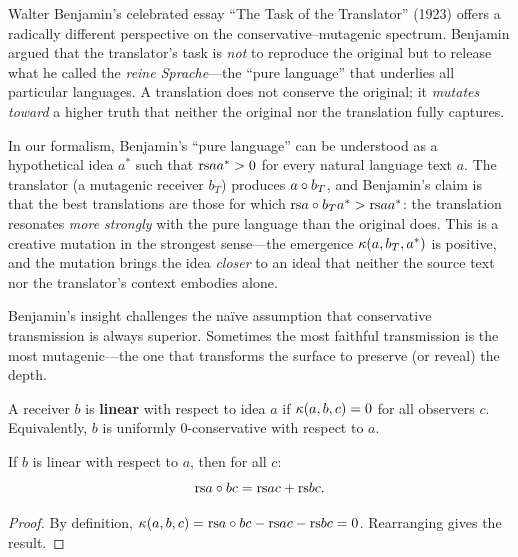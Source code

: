 \begin{interpretation}
\label{interp:ch9:benjamin_translator}
Walter Benjamin's celebrated essay ``The Task of the Translator'' (1923)
offers a radically different perspective on the conservative--mutagenic
spectrum.  Benjamin argued that the translator's task is \emph{not} to
reproduce the original but to release what he called the \emph{reine
Sprache}---the ``pure language'' that underlies all particular languages.  A
translation does not conserve the original; it \emph{mutates toward} a higher
truth that neither the original nor the translation fully captures.

In our formalism, Benjamin's ``pure language'' can be understood as a
hypothetical idea $a^*$ such that $\mathrm{rs}{a}{a^*} > 0$ for every natural
language text $a$.  The translator (a mutagenic receiver $b_T$) produces
$a \circ b_T$, and Benjamin's claim is that the best translations are
those for which $\mathrm{rs}{a \circ b_T}{a^*} > \mathrm{rs}{a}{a^*}$: the translation
resonates \emph{more strongly} with the pure language than the original does.
This is a creative mutation in the strongest sense---the emergence
$\kappa(a, b_T, a^*)$ is positive, and the mutation brings the idea
\emph{closer} to an ideal that neither the source text nor the translator's
context embodies alone.

Benjamin's insight challenges the na\"{i}ve assumption that conservative
transmission is always superior.  Sometimes the most faithful transmission
is the most mutagenic---the one that transforms the surface to preserve (or
reveal) the depth.
\end{interpretation}



\begin{definition}
\label{def:linear}
A receiver $b$ is \textbf{linear} with respect to idea $a$ if
$\kappa(a, b, c) = 0$ for all observers $c$.
Equivalently, $b$ is uniformly $0$-conservative with respect to $a$.
\end{definition}

\begin{proposition}
\label{prop:linear-additive}
If $b$ is linear with respect to $a$, then for all $c$:
\[
  \mathrm{rs}{a \circ b}{c} = \mathrm{rs}{a}{c} + \mathrm{rs}{b}{c}.
\]
\end{proposition}

\begin{proof}
By definition, $\kappa(a, b, c) = \mathrm{rs}{a \circ b}{c} - \mathrm{rs}{a}{c} - \mathrm{rs}{b}{c} = 0$.
Rearranging gives the result.
\end{proof}

